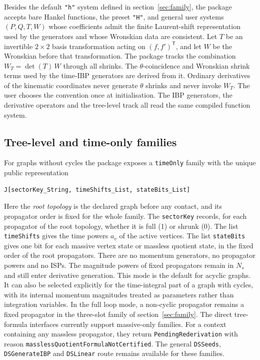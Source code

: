 \documentclass[11pt,a4paper]{article}
\begin{document}
Besides the default \texttt{"h"} system defined in section~\ref{sec:family}, the package accepts
bare Hankel functions, the preset \texttt{"H"}, and
general user systems $(P,Q,T,W)$ whose coefficients admit the finite Laurent-shift representation
used by the generators and whose Wronskian data are consistent.
Let $T$ be an invertible $2\times2$ basis transformation acting on $(f,f')^{\mathsf T}$,
and let $W$ be the Wronskian before that transformation. The package
tracks the combination $W_T=\det(T)\,W$ through all shrinks. The $\theta$-coincidence and Wronskian
shrink terms used by the time-IBP generators are derived from it. Ordinary derivatives of the
kinematic coordinates never generate $\theta$ shrinks and never invoke $W_T$. The user chooses the
convention
once at initialisation. The IBP generators, the derivative operators and the tree-level track all
read the same compiled function system.

\subsection{Tree-level and time-only families}
\label{sec:timeonly}

For graphs without cycles the package exposes a \texttt{timeOnly} family with the unique public
representation
\begin{verbatim}
J[sectorKey_String, timeShifts_List, stateBits_List]
\end{verbatim}
Here the \emph{root topology} is the declared graph before any contact, and its propagator order is
fixed for the whole family. The \texttt{sectorKey} records, for each propagator of the root
topology, whether it is full (1)
or shrunk (0). The list \texttt{timeShifts} gives the time powers $a_v$ of the active vertices. The
list \texttt{stateBits} gives one bit for each massive vertex state or massless quotient state, in
the fixed order of the root propagators. There are no momentum generators, no propagator powers
and no ISPs. The magnitude powers of fixed propagators remain in $N_s$
and still enter derivative generation. This mode is the default for acyclic graphs. It can also
be selected explicitly for the time-integral part of a graph with cycles, with its internal
momentum magnitudes treated as parameters rather than integration variables. In the full loop
mode, a non-cyclic propagator remains a fixed propagator in the three-slot family of
section~\ref{sec:family}. The direct tree-formula interfaces currently support massive-only families.
For a context containing any massless propagator, they return \texttt{PendingRederivation}
with reason \texttt{masslessQuotientFormulaNotCertified}. The general
\texttt{DSSeeds}, \texttt{DSGenerateIBP} and \texttt{DSLinear} route remains available for these
families.
\end{document}
